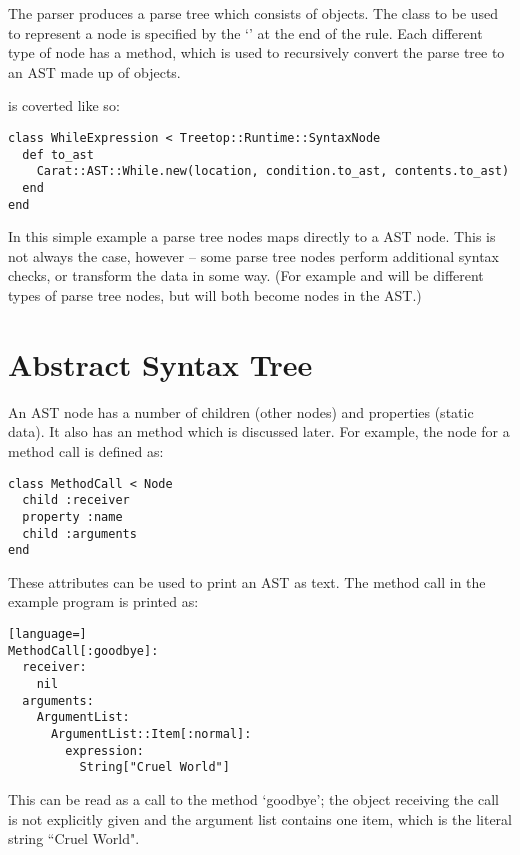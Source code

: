 The parser produces a parse tree which consists of  objects. The class to be used to represent a  node is specified by the `' at the end of the rule. Each different type of node has a  method, which is used to recursively convert the parse tree to an AST made up of  objects.

 is coverted like so:

\begin{lstlisting}
class WhileExpression < Treetop::Runtime::SyntaxNode
  def to_ast
    Carat::AST::While.new(location, condition.to_ast, contents.to_ast)
  end
end
\end{lstlisting}

In this simple example a  parse tree nodes maps directly to a  AST node. This is not always the case, however -- some parse tree nodes perform additional syntax checks, or transform the data in some way. (For example  and  will be different types of parse tree nodes, but will both become  nodes in the AST.)

\section{Abstract Syntax Tree}

An AST node has a number of children (other nodes) and properties (static data). It also has an  method which is discussed later. For example, the node for a method call is defined as:

\begin{lstlisting}
class MethodCall < Node
  child :receiver
  property :name
  child :arguments
end
\end{lstlisting}

These attributes can be used to print an AST as text. The method call in the example program is printed as:

\begin{lstlisting}[language=]
MethodCall[:goodbye]:
  receiver:
    nil
  arguments:
    ArgumentList:
      ArgumentList::Item[:normal]:
        expression:
          String["Cruel World"]
\end{lstlisting}

This can be read as a call to the method `goodbye'; the object receiving the call is not explicitly given and the argument list contains one item, which is the literal string ``Cruel World".


